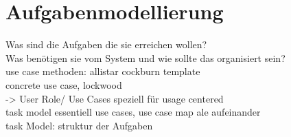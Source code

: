 
\section{Aufgabenmodellierung}

Was sind die Aufgaben die sie erreichen wollen?\\
Was benötigen sie vom System und wie sollte das organisiert sein?\\

use case methoden: allistar cockburn template \\
concrete use case, lockwood\\


-> User Role/ Use Cases speziell für usage centered	\\
task model essentiell use cases, use case map ale aufeinander\\

task Model: struktur der Aufgaben\\
